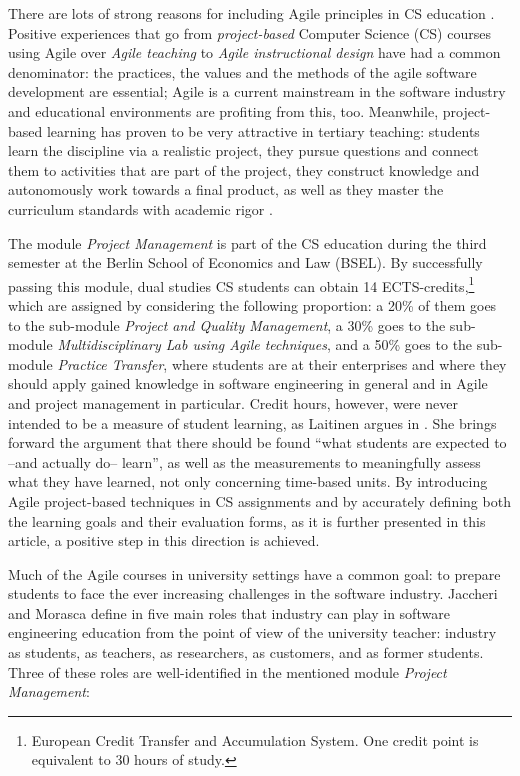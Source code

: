 \documentclass[conference]{IEEEtran}
\begin{document}
There are lots of strong reasons for including Agile principles in CS education \cite{HaDu07}. Positive experiences that go from \textit{project-based} Computer Science (CS) courses using Agile \cite{Pe09,Scetal12} over \textit{Agile teaching} \cite{RaAn06} to \textit{Agile instructional design} \cite{LeVa12} have had a common denominator: the practices, the values and the methods of the agile software development are essential; Agile is a current mainstream in the software industry \cite{VO13} and educational environments are profiting from this, too. Meanwhile, project-based learning has proven to be very attractive in tertiary teaching: students learn the discipline via a realistic project, they pursue questions and connect them to activities that are part of the project, they construct knowledge and autonomously work towards a final product, as well as they master the curriculum standards with academic rigor \cite{Th00}.

The module \textit{Project Management} is part of the CS education during the third semester at the Berlin School of Economics and Law (BSEL). By successfully passing this module, dual studies CS students can obtain 14 ECTS-credits,\footnote{European Credit Transfer and Accumulation System. One credit point is equivalent to 30 hours of study.} which are assigned by considering the following proportion: a 20\% of them goes to the sub-module \textit{Project and Quality Management}, a 30\% goes to the sub-module \textit{Multidisciplinary Lab using Agile techniques}, and a 50\% goes to the sub-module \textit{Practice Transfer}, where students are at their enterprises and where they should apply gained knowledge in software engineering in general and in Agile and project management in particular. Credit hours, however, were never intended to be a measure of student learning, as Laitinen argues in \cite{La13}. She brings forward the argument that there should be found ``what students are expected to --and actually do-- learn'', as well as the measurements to meaningfully assess what they have learned, not only concerning time-based units. By introducing Agile project-based techniques in CS assignments and by accurately defining both the learning goals and their evaluation forms, as it is further presented in this article, a positive step in this direction is achieved. 

Much of the Agile courses in university settings have a common goal: to prepare students to face the ever increasing challenges in the software industry. Jaccheri and Morasca define in \cite{JaMo06} five main roles that industry can play in software engineering education from the point of view of the university teacher: industry as students, as teachers, as researchers, as customers, and as former students. Three of these roles are well-identified in the mentioned module \textit{Project Management}:
\end{document}

